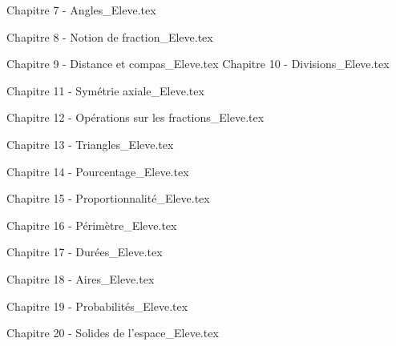 \documentclass[a4paper,12pt,twoside]{article}
\numberwithin{dummy}{section}
\theoremstyle{ocrenumboxTh}
\theoremstyle{ocrenumboxExercice}
\theoremstyle{ocrenumboxExercice}
\theoremstyle{ocrenumboxEx}
\theoremstyle{ocrenumboxEx}
\theoremstyle{ocrenumboxTh}
\theoremstyle{ocrenumboxTh*}
\theoremstyle{ocrenumboxTh}
\theoremstyle{ocrenumboxTh*}
\theoremstyle{ocrenumboxCoro}
\theoremstyle{ocrenumboxCoro*}
\theoremstyle{ocrenumboxCoro}
\theoremstyle{ocrenumboxCoro*}
\theoremstyle{ocrenumboxProp}
\theoremstyle{ocrenumboxProp*}
\theoremstyle{ocrenumboxProp}
\theoremstyle{ocrenumboxProp*}
\theoremstyle{ocrenumboxMéthode}
\theoremstyle{ocrenumboxMéthode}
\theoremstyle{ocrenumboxDef}
\theoremstyle{ocrenumboxDef*}
\theoremstyle{ocrenumboxDef}
\theoremstyle{ocrenumboxDef*}
\theoremstyle{ocrenumboxReg}
\theoremstyle{ocrenumboxReg*}
\theoremstyle{ocrenumboxReg}
\theoremstyle{ocrenumboxReg*}
\theoremstyle{ocrenumboxVoc}
\theoremstyle{ocrenumboxVoc}
\theoremstyle{ocrenumboxNot}
\theoremstyle{ocrenumboxNot}
\theoremstyle{ocrenumboxNot*}
\theoremstyle{ocrenumboxNot*}
\theoremstyle{ocrenum}
\begin{document}
\newpage

{Chapitre 7 - Angles_Eleve.tex}

\newpage
{}
{Chapitre 8 - Notion de fraction_Eleve.tex}

\newpage

{Chapitre 9 - Distance et compas_Eleve.tex}
\newpage
{Chapitre 10 -  Divisions_Eleve.tex}

\newpage

{Chapitre 11 - Symétrie axiale_Eleve.tex}


\newpage

{Chapitre 12 - Opérations sur les fractions_Eleve.tex}

\newpage

{Chapitre 13 - Triangles_Eleve.tex}

\newpage

{Chapitre 14 - Pourcentage_Eleve.tex}

\newpage

{Chapitre 15 - Proportionnalité_Eleve.tex}

\newpage

{Chapitre 16 - Périmètre_Eleve.tex}

\newpage
{}
{Chapitre 17 - Durées_Eleve.tex}

\newpage
{Chapitre 18 - Aires_Eleve.tex}

\newpage

{Chapitre 19 - Probabilités_Eleve.tex}

\newpage

{Chapitre 20 - Solides de l'espace_Eleve.tex}
\end{document}
